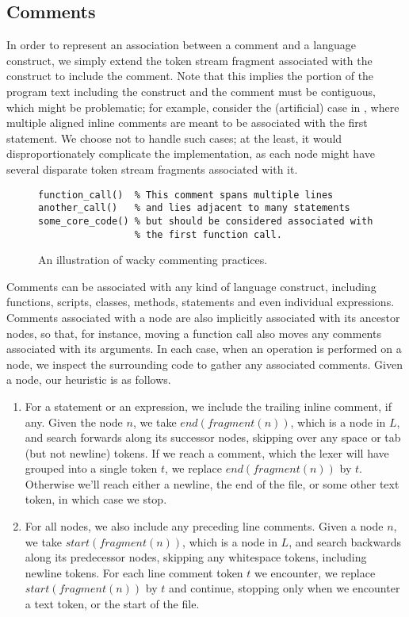 \subsection{Comments}

In order to represent an association between a comment and a language
construct, we simply extend the token stream fragment associated with the
construct to include the comment. Note that this implies the portion of the
program text including the construct and the comment must be contiguous,
which might be problematic; for example, consider the (artificial) case
in , where multiple aligned inline comments are
meant to be associated with the first statement. We choose not to handle
such cases; at the least, it would disproportionately complicate the
implementation, as each node might have several disparate token stream
fragments associated with it.

\begin{figure}
\begin{lstlisting}[keepspaces=true]
function_call()  % This comment spans multiple lines
another_call()   % and lies adjacent to many statements
some_core_code() % but should be considered associated with
                 % the first function call.
\end{lstlisting}
\caption{An illustration of wacky commenting practices.}
\label{Fig:WackyComments}
\end{figure}

Comments can be associated with any kind of language construct, including
functions, scripts, classes, methods, statements and even individual
expressions. Comments associated with a node are also implicitly associated
with its ancestor nodes, so that, for instance, moving a function call also
moves any comments associated with its arguments. In each case, when an
operation is performed on a node, we inspect the surrounding code to gather any
associated comments. Given a node, our heuristic is as follows.

\begin{enumerate}
  \item For a statement or an expression, we include the trailing inline
    comment, if any. Given the node $n$, we take $end(fragment(n))$, which is a
    node in $L$, and search forwards along its successor nodes, skipping over
    any space or tab (but not newline) tokens. If we reach a comment, which the
    lexer will have grouped into a single token $t$, we replace
    $end(fragment(n))$ by $t$. Otherwise we'll reach either a newline, the end
    of the file, or some other text token, in which case we stop.
  \item For all nodes, we also include any preceding line comments. Given
    a node $n$, we take $start(fragment(n))$, which is a node in $L$, and
    search backwards along its predecessor nodes, skipping any whitespace
    tokens, including newline tokens. For each line comment token $t$ we
    encounter, we replace $start(fragment(n))$ by $t$ and continue, stopping
    only when we encounter a text token, or the start of the file.
\end{enumerate}

